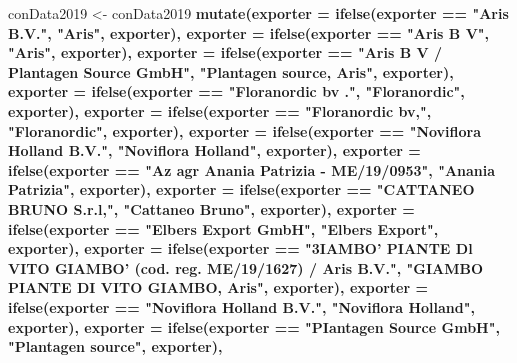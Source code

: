 \documentclass[]{article}
\newenvironment{Shaded}{\begin{snugshade}}{\end{snugshade}}
\newcommand{\DataTypeTok}[1]{\textcolor[rgb]{0.13,0.29,0.53}{#1}}
\newcommand{\KeywordTok}[1]{\textcolor[rgb]{0.13,0.29,0.53}{\textbf{#1}}}
\newcommand{\NormalTok}[1]{#1}
\newcommand{\OperatorTok}[1]{\textcolor[rgb]{0.81,0.36,0.00}{\textbf{#1}}}
\newcommand{\StringTok}[1]{\textcolor[rgb]{0.31,0.60,0.02}{#1}}
\begin{document}
\begin{Shaded}
\begin{Highlighting}[]
\NormalTok{conData2019 <-}\StringTok{ }\NormalTok{conData2019 }\OperatorTok{%>%}\StringTok{ }
\StringTok{  }\KeywordTok{mutate}\NormalTok{(}\DataTypeTok{exporter =} \KeywordTok{ifelse}\NormalTok{(exporter }\OperatorTok{==}\StringTok{ "Aris B.V."}\NormalTok{, }\StringTok{"Aris"}\NormalTok{, exporter),}
         \DataTypeTok{exporter =} \KeywordTok{ifelse}\NormalTok{(exporter }\OperatorTok{==}\StringTok{ "Aris B V"}\NormalTok{, }\StringTok{"Aris"}\NormalTok{, exporter),}
         \DataTypeTok{exporter =} \KeywordTok{ifelse}\NormalTok{(exporter }\OperatorTok{==}\StringTok{ "Aris B V / Plantagen Source GmbH"}\NormalTok{, }\StringTok{"Plantagen source, Aris"}\NormalTok{, exporter),}
         \DataTypeTok{exporter =} \KeywordTok{ifelse}\NormalTok{(exporter }\OperatorTok{==}\StringTok{ "Floranordic bv ."}\NormalTok{, }\StringTok{"Floranordic"}\NormalTok{, exporter),}
         \DataTypeTok{exporter =} \KeywordTok{ifelse}\NormalTok{(exporter }\OperatorTok{==}\StringTok{ "Floranordic bv,"}\NormalTok{, }\StringTok{"Floranordic"}\NormalTok{, exporter),}
         \DataTypeTok{exporter =} \KeywordTok{ifelse}\NormalTok{(exporter }\OperatorTok{==}\StringTok{ "Noviflora Holland B.V."}\NormalTok{, }\StringTok{"Noviflora Holland"}\NormalTok{, exporter),}
         \DataTypeTok{exporter =} \KeywordTok{ifelse}\NormalTok{(exporter }\OperatorTok{==}\StringTok{ "Az agr Anania Patrizia - ME/19/0953"}\NormalTok{, }\StringTok{"Anania Patrizia"}\NormalTok{, exporter),}
         \DataTypeTok{exporter =} \KeywordTok{ifelse}\NormalTok{(exporter }\OperatorTok{==}\StringTok{ "CATTANEO BRUNO S.r.l,"}\NormalTok{, }\StringTok{"Cattaneo Bruno"}\NormalTok{, exporter),}
         \DataTypeTok{exporter =} \KeywordTok{ifelse}\NormalTok{(exporter }\OperatorTok{==}\StringTok{ "Elbers Export GmbH"}\NormalTok{, }\StringTok{"Elbers Export"}\NormalTok{, exporter),}
         \DataTypeTok{exporter =} \KeywordTok{ifelse}\NormalTok{(exporter }\OperatorTok{==}\StringTok{ "3IAMBO' PIANTE Dl VITO GIAMBO' (cod. reg. ME/19/1627) / Aris B.V."}\NormalTok{, }\StringTok{"GIAMBO PIANTE DI VITO GIAMBO, Aris"}\NormalTok{, exporter),}
         \DataTypeTok{exporter =} \KeywordTok{ifelse}\NormalTok{(exporter }\OperatorTok{==}\StringTok{ "Noviflora Holland B.V."}\NormalTok{, }\StringTok{"Noviflora Holland"}\NormalTok{, exporter),}
         \DataTypeTok{exporter =} \KeywordTok{ifelse}\NormalTok{(exporter }\OperatorTok{==}\StringTok{ "PIantagen Source GmbH"}\NormalTok{, }\StringTok{"Plantagen source"}\NormalTok{, exporter),}
}
\end{Highlighting}
\end{Shaded}
\end{document}
